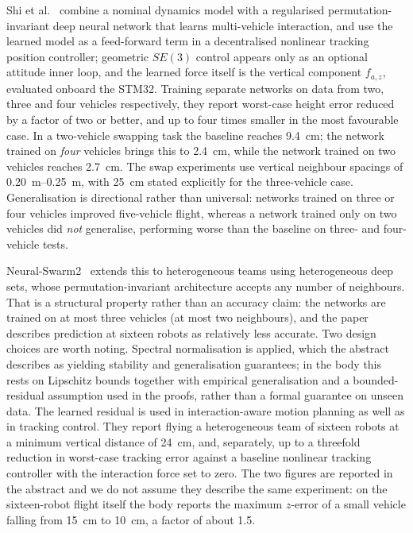 Shi et al.~\cite{shi2020neuralswarm} combine a nominal dynamics model with a regularised
permutation-invariant deep neural network that learns multi-vehicle interaction, and use the
learned model as a feed-forward term in a decentralised nonlinear tracking position controller;
geometric \(SE(3)\) control appears only as an optional attitude inner loop, and the learned
force itself is the vertical component \(f_{a,z}\), evaluated onboard the STM32. Training
separate networks on data from two, three and four vehicles respectively, they report worst-case
height error reduced by a factor of two or better, and up to four times smaller in the most
favourable case. In a two-vehicle swapping task the baseline reaches \SI{9.4}{\centi\metre};
the network trained on \emph{four} vehicles brings this to \SI{2.4}{\centi\metre}, while the
network trained on two vehicles reaches \SI{2.7}{\centi\metre}. The swap experiments use vertical
neighbour spacings of \SIrange{0.20}{0.25}{\metre}, with \SI{25}{\centi\metre} stated explicitly
for the three-vehicle case. Generalisation is directional rather than universal: networks trained
on three or four vehicles improved five-vehicle flight, whereas a network trained only on two
vehicles did \emph{not} generalise, performing worse than the baseline on three- and four-vehicle
tests.

Neural-Swarm2~\cite{shi2022neuralswarm2} extends this to heterogeneous teams using heterogeneous
deep sets, whose permutation-invariant architecture accepts any number of neighbours. That is a
structural property rather than an accuracy claim: the networks are trained on at most three
vehicles (at most two neighbours), and the paper describes prediction at sixteen robots as
relatively less accurate. Two design choices are worth noting. Spectral normalisation is applied,
which the abstract describes as yielding stability and generalisation guarantees; in the body this
rests on Lipschitz bounds together with empirical generalisation and a bounded-residual assumption
used in the proofs, rather than a formal guarantee on unseen data. The learned residual is used in
interaction-aware motion planning as well as in tracking control. They report flying a
heterogeneous team of sixteen robots at a minimum vertical distance of \SI{24}{\centi\metre}, and,
separately, up to a threefold reduction in worst-case tracking error against a baseline nonlinear
tracking controller with the interaction force set to zero. The two figures are reported in the
abstract and we do not assume they describe the same experiment: on the sixteen-robot flight
itself the body reports the maximum \(z\)-error of a small vehicle falling from \SI{15}{\centi\metre}
to \SI{10}{\centi\metre}, a factor of about \num{1.5}.

